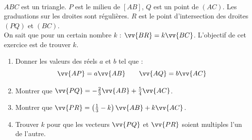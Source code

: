 \documentclass[main.tex]{subfiles}
\begin{document}
\begin{exercise}\hfill \\
$ABC$ est un triangle. $P$ est le milieu de $[AB]$, $Q$ est un point de $(AC)$. 
Les graduations sur les droites sont régulières.  
$R$ est le point d'intersection des droites $(PQ)$ et $(BC)$. \\
On sait que pour un certain nombre $k$ : $\vv{BR}=k\vv{BC}$.
L'objectif de cet exercice est de trouver $k$.\\
\begin{minipage}{0.5\columnwidth} 
\begin{enumerate}
\item Donner les valeurs des réels $a$ et $b$ tel que :
\[
\vv{AP}=a\vv{AB}\qquad \vv{AQ}=b\vv{AC} 
\] 
\item Montrer que $\vv{PQ}=-\tfrac{2}{3}\vv{AB}+\tfrac{5}{4}\vv{AC}$.
\item Montrer que $\vv{PR}=\left(\tfrac{1}{3}-k\right)\vv{AB}+k\vv{AC}$.
\item Trouver $k$ pour que les vecteurs $\vv{PQ}$ et $\vv{PR}$ soient multiples l'un de l'autre. 
\end{enumerate}
\end{minipage}
\begin{minipage}{0.5\columnwidth}\centering
{}
\end{minipage} 
\end{exercise} 
\end{document}
